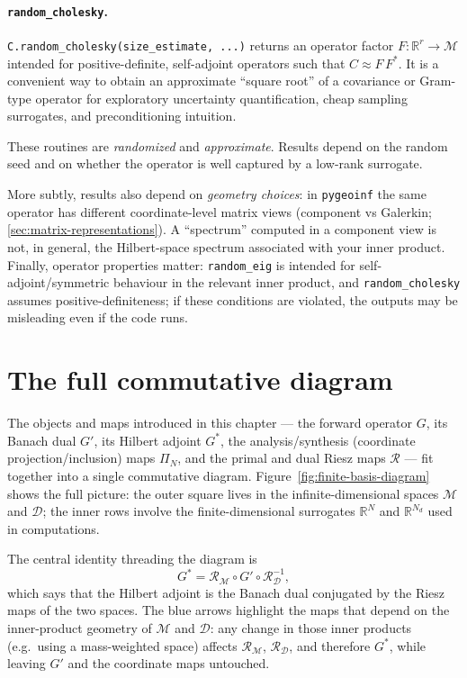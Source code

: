 \documentclass[11pt,twoside,openright]{book}
\theoremstyle{plain}
\theoremstyle{definition}
\theoremstyle{remark}
\newcommand{\modelspace}{\mathcal{M}}
\newcommand{\dataspace}{\mathcal{D}}
\newcommand{\RieszM}{\mathcal{R}_{\modelspace}}
\newcommand{\RieszD}{\mathcal{R}_{\dataspace}}
\newcommand{\Riesz}{\mathcal{R}}
\newcommand{\Gadj}{G^*}
\begin{document}
\paragraph{\texttt{random\_cholesky}.}
\texttt{C.random\_cholesky(size\_estimate, ...)} returns an operator factor
\(F:\mathbb{R}^r\to\modelspace\) intended for positive-definite, self-adjoint
operators such that
\(C \approx F\,F^*\).
It is a convenient way to obtain an approximate ``square root'' of a covariance
or Gram-type operator for exploratory uncertainty quantification, cheap sampling
surrogates, and preconditioning intuition.

\begin{pitfallbox}
These routines are \emph{randomized} and \emph{approximate}. Results depend on
the random seed and on whether the operator is well captured by a low-rank
surrogate.

More subtly, results also depend on \emph{geometry choices}: in \texttt{pygeoinf}
the same operator has different coordinate-level matrix views (component vs
Galerkin; \cref{sec:matrix-representations}). A ``spectrum'' computed in a
component view is not, in general, the Hilbert-space spectrum associated with
your inner product.
Finally, operator properties matter: \texttt{random\_eig} is intended for
self-adjoint/symmetric behaviour in the relevant inner product, and
\texttt{random\_cholesky} assumes positive-definiteness; if these conditions are
violated, the outputs may be misleading even if the code runs.
\end{pitfallbox}

\section{The full commutative diagram}
\label{sec:operator-diagram}

The objects and maps introduced in this chapter — the forward operator $G$,
its Banach dual $G'$, its Hilbert adjoint $\Gadj$, the analysis/synthesis
(coordinate projection/inclusion) maps $\Pi_N$, and the primal and dual
Riesz maps $\Riesz$ — fit together into a single commutative diagram.
Figure~\ref{fig:finite-basis-diagram} shows the full picture: the outer square
lives in the infinite-dimensional spaces $\modelspace$ and $\dataspace$; the
inner rows involve the finite-dimensional surrogates
$\mathbb{R}^N$ and $\mathbb{R}^{N_d}$ used in computations.

The central identity threading the diagram is
\begin{equation}
  \label{eq:adjoint-riesz-commute}
  \Gadj = \RieszM \circ G' \circ \RieszD^{-1},
\end{equation}
which says that the Hilbert adjoint is the Banach dual conjugated by the
Riesz maps of the two spaces.  The blue arrows highlight the maps that
depend on the inner-product geometry of $\modelspace$ and $\dataspace$: any
change in those inner products (e.g.\ using a mass-weighted space) affects
$\RieszM$, $\RieszD$, and therefore $\Gadj$, while leaving $G'$ and the
coordinate maps untouched.
\end{document}
